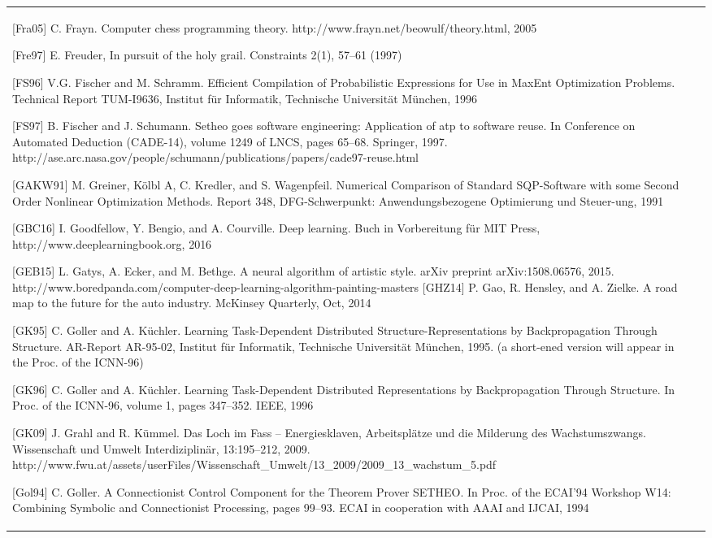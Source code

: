 \documentclass[10pt]{book}
\begin{document}
\begin{tabular}{|l|l|}
[Fra05] C. Frayn. Computer chess programming theory. http://www.frayn.net/beowulf/theory.html, 2005

[Fre97] E. Freuder, In pursuit of the holy grail. Constraints 2(1), 57–61 (1997)

[FS96] V.G. Fischer and M. Schramm. Efficient Compilation of Probabilistic Expressions for Use in MaxEnt Optimization Problems. Technical Report TUM-I9636, Institut für Informatik, Technische Universität München, 1996

[FS97] B. Fischer and J. Schumann. Setheo goes software engineering: Application of atp to software reuse. In Conference on Automated Deduction (CADE-14), volume 1249 of LNCS, pages 65–68. Springer, 1997. http://ase.arc.nasa.gov/people/schumann/publications/papers/cade97-reuse.html

[GAKW91] M. Greiner, Kölbl A, C. Kredler, and S. Wagenpfeil. Numerical Comparison of Standard SQP-Software with some Second Order Nonlinear Optimization Methods. Report 348, DFG-Schwerpunkt: Anwendungsbezogene Optimierung und Steuer-ung, 1991

[GBC16] I. Goodfellow, Y. Bengio, and A. Courville. Deep learning. Buch in Vorbereitung für MIT Press, http://www.deeplearningbook.org, 2016

[GEB15] L. Gatys, A. Ecker, and M. Bethge. A neural algorithm of artistic style. arXiv preprint arXiv:1508.06576, 2015. http://www.boredpanda.com/computer-deep-learning-algorithm-painting-masters
[GHZ14] P. Gao, R. Hensley, and A. Zielke. A road map to the future for the auto industry. McKinsey Quarterly, Oct, 2014

[GK95] C. Goller and A. Küchler. Learning Task-Dependent Distributed Structure-Representations by Backpropagation Through Structure. AR-Report AR-95-02, Institut für Informatik, Technische Universität München, 1995. (a short-ened version will appear in the Proc. of the ICNN-96)

[GK96] C. Goller and A. Küchler. Learning Task-Dependent Distributed Representations by Backpropagation Through Structure. In Proc. of the ICNN-96, volume 1, pages 347–352. IEEE, 1996

[GK09] J. Grahl and R. Kümmel. Das Loch im Fass – Energiesklaven, Arbeitsplätze und die Milderung des Wachstumszwangs. Wissenschaft und Umwelt Interdiziplinär, 13:195–212, 2009. http://www.fwu.at/assets/userFiles/Wissenschaft\_Umwelt/13\_2009/2009\_13\_wachstum\_5.pdf

[Gol94] C. Goller. A Connectionist Control Component for the Theorem Prover SETHEO. In Proc. of the ECAI'94 Workshop W14: Combining Symbolic and Connectionist Processing, pages 99–93. ECAI in cooperation with AAAI and IJCAI, 1994


\end{tabular}
\end{document}
